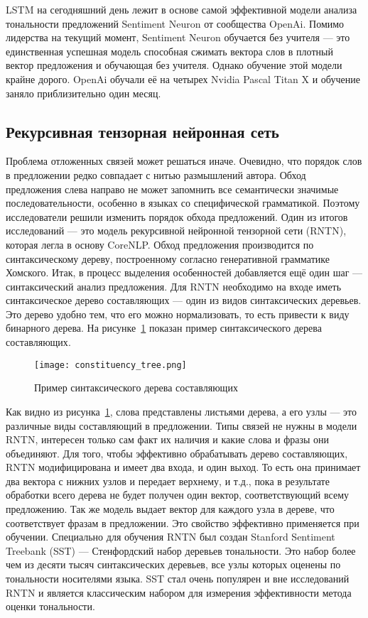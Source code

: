 LSTM на сегодняшний день лежит в основе самой эффективной модели анализа тональности предложений Sentiment Neuron от сообщества OpenAi. Помимо лидерства на текущий момент, Sentiment Neuron обучается без учителя --- это единственная успешная модель способная сжимать вектора слов в плотный вектор предложения и обучающая без учителя. Однако обучение этой модели крайне дорого. OpenAi обучали её на четырех Nvidia Pascal Titan X и обучение заняло приблизительно один месяц\cite{openai}.

\subsection{Рекурсивная тензорная нейронная сеть}
Проблема отложенных связей может решаться иначе. Очевидно, что порядок слов в предложении редко совпадает с нитью размышлений автора. Обход предложения слева направо не может запомнить все семантически значимые последовательности, особенно в языках со специфической грамматикой. Поэтому исследователи решили изменить порядок обхода предложений. Один из итогов исследований --- это модель рекурсивной нейронной тензорной сети (RNTN), которая легла в основу CoreNLP\@. Обход предложения производится по синтаксическому дереву, построенному согласно генеративной грамматике Хомского\cite{Chomsky}.
Итак, в процесс выделения особенностей добавляется ещё один шаг --- синтаксический анализ предложения. Для RNTN необходимо на входе иметь синтаксическое дерево составляющих --- один из видов синтаксических деревьев. Это дерево удобно тем, что его можно нормализовать, то есть привести к виду бинарного дерева. На рисунке~\ref{fig:overview:constituency_tree} показан пример синтаксического дерева составляющих\cite{Chomsky}.

\begin{figure}[h]
  \begin{center}
    \texttt{[image: constituency\_tree.png]}
    \caption{Пример синтаксического дерева составляющих}\label{fig:overview:constituency_tree}
  \end{center}
\end{figure}

Как видно из рисунка~\ref{fig:overview:constituency_tree}, слова представлены листьями дерева, а его узлы --- это различные виды составляющий в предложении. Типы связей не нужны в модели RNTN, интересен только сам факт их наличия и какие слова и фразы они объединяют. Для того, чтобы эффективно обрабатывать дерево составляющих, RNTN модифицирована и имеет два входа, и один выход. То есть она принимает два вектора с нижних узлов и передает верхнему, и т.д., пока в результате обработки всего дерева не будет получен один вектор, соответствующий всему предложению. Так же модель выдает вектор для каждого узла в дереве, что соответствует фразам в предложении. Это свойство эффективно применяется при обучении. Специально для обучения RNTN был создан Stanford Sentiment Treebank (SST) --- Стенфордский набор деревьев тональности. Это набор более чем из десяти тысяч синтаксических деревьев, все узлы которых оценены по тональности носителями языка. SST стал очень популярен и вне исследований RNTN и является классическим набором для измерения эффективности метода оценки тональности\cite{RNTN}.

